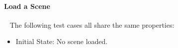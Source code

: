 \documentclass[12pt, titlepage]{article}
\begin{document}
		
\paragraph{Load a Scene}
~\newline
The following test cases all share the same properties:

\begin{itemize}
	\item[] Initial State: No scene loaded.
\end{itemize}
\end{document}
